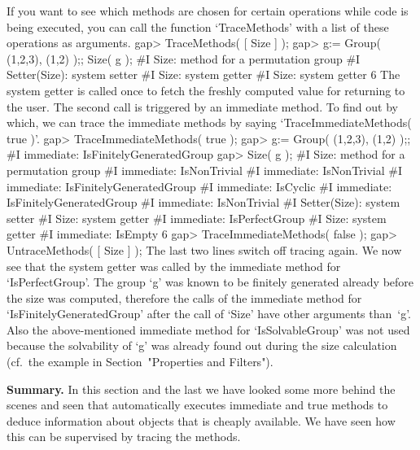 %
If you want to see which methods  are chosen for certain operations while
{\GAP}  code is being executed,  you can call the function `TraceMethods'
with a list of these operations as arguments.
\beginexample
gap> TraceMethods( [ Size ] );
gap> g:= Group( (1,2,3), (1,2) );;  Size( g );
#I  Size: method for a permutation group
#I  Setter(Size): system setter
#I  Size: system getter
#I  Size: system getter
6
\endexample
The system getter is called once to fetch  the freshly computed value for
returning  to the user.  The  second  call is  triggered by  an immediate
method. To  find out  by which,  we can trace   the immediate  methods by
saying `TraceImmediateMethods( true )'.
\beginexample
gap> TraceImmediateMethods( true );
gap> g:= Group( (1,2,3), (1,2) );;
#I  immediate: IsFinitelyGeneratedGroup
gap> Size( g );
#I  Size: method for a permutation group
#I  immediate: IsNonTrivial
#I  immediate: IsNonTrivial
#I  immediate: IsFinitelyGeneratedGroup
#I  immediate: IsCyclic
#I  immediate: IsFinitelyGeneratedGroup
#I  immediate: IsNonTrivial
#I  Setter(Size): system setter
#I  Size: system getter
#I  immediate: IsPerfectGroup
#I  Size: system getter
#I  immediate: IsEmpty
6
gap> TraceImmediateMethods( false );
gap> UntraceMethods( [ Size ] );
\endexample
The last two lines switch off tracing  again. We now  see that the system
getter was called by the immediate method for `IsPerfectGroup'. The group
`g' was   known to be finitely   generated  already before the   size was
computed,   therefore the   calls     of   the  immediate    method   for
`IsFinitelyGeneratedGroup' after the  call of `Size' have other arguments
than~`g'. Also the above-mentioned immediate method for `IsSolvableGroup'
was not used because the solvability of `g'  was already found out during
the size calculation
(cf.~the example in Section~"Properties and Filters").

{\bf Summary.}  In this section  and the  last we have  looked some  more
behind the  scenes and seen  that {\GAP} automatically executes immediate
and true  methods  to deduce  information about  objects  that is cheaply
available.  We  have seen how   this  can be  supervised  by tracing  the
methods.


